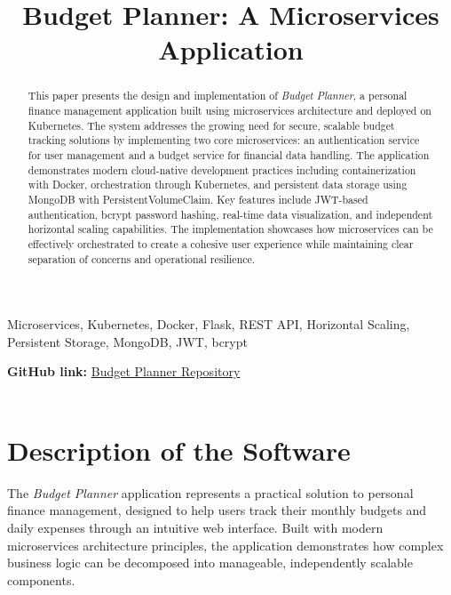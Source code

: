 \documentclass[conference]{IEEEtran}
\begin{document}
\title{Budget Planner: A Microservices Application}

\author{ %
} %

\maketitle

\begin{abstract}
This paper presents the design and implementation of \emph{Budget Planner}, a personal finance management application built using microservices architecture and deployed on Kubernetes. The system addresses the growing need for secure, scalable budget tracking solutions by implementing two core microservices: an authentication service for user management and a budget service for financial data handling. The application demonstrates modern cloud-native development practices including containerization with Docker, orchestration through Kubernetes, and persistent data storage using MongoDB with PersistentVolumeClaim. Key features include JWT-based authentication, bcrypt password hashing, real-time data visualization, and independent horizontal scaling capabilities. The implementation showcases how microservices can be effectively orchestrated to create a cohesive user experience while maintaining clear separation of concerns and operational resilience.
\end{abstract}

\begin{IEEEkeywords}
Microservices, Kubernetes, Docker, Flask, REST API, Horizontal Scaling, Persistent Storage, MongoDB, JWT, bcrypt
\end{IEEEkeywords}

\noindent\textbf{GitHub link: }
\href{https://github.com/md-d-cdr-4304/budget-planner}{Budget Planner Repository}\\
\\[2mm]

\section{\textbf{Description of the Software}}
The \emph{Budget Planner} application represents a practical solution to personal finance management, designed to help users track their monthly budgets and daily expenses through an intuitive web interface. Built with modern microservices architecture principles, the application demonstrates how complex business logic can be decomposed into manageable, independently scalable components.
\end{document}
